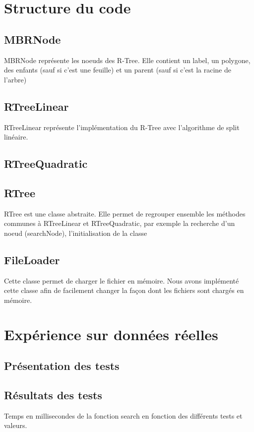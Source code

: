 \documentclass[utf8]{article}
\begin{document}
\begin{large}
\section{Structure du code}

\par
\subsection{MBRNode}
MBRNode représente les noeuds des R-Tree. Elle contient un label, un polygone,
des enfants (sauf si c'est une feuille) et un parent (sauf si c'est la racine de
l'arbre)

\subsection{RTreeLinear}\label{RTreeLinear}

RTreeLinear représente l'implémentation du R-Tree avec l'algorithme de split linéaire.
\subsection{RTreeQuadratic}\label{RTreeQ}

\subsection{RTree}

RTree est une classe abstraite. Elle permet de regrouper ensemble les méthodes
communes à RTreeLinear et RTreeQuadratic, par exemple la
recherche d'un noeud (searchNode), l'initialisation de la classe


\subsection{FileLoader}

Cette classe permet de charger le fichier en mémoire. Nous avons implémenté
cette classe afin de facilement changer la façon dont les fichiers sont chargés
en mémoire.

\section{Expérience sur données réelles}
\subsection{Présentation des tests}

\subsection{Résultats des tests}
Temps en millisecondes de la fonction search en fonction des différents tests et valeurs.


\end{large}
\end{document}
